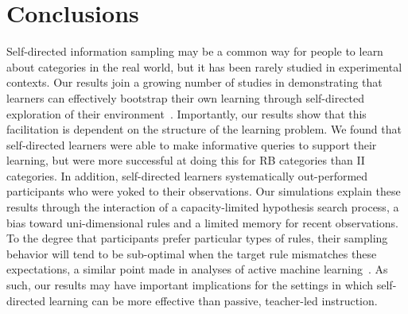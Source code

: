 \documentclass[3p,twocolumn,authoryear,10pt]{elsarticle}
\begin{document}
\section{Conclusions} 

Self-directed information sampling may be a common way for people to learn about categories 
in the real world, but it has been rarely studied in experimental contexts. Our results join a growing number of studies in demonstrating that learners can effectively bootstrap their own learning through self-directed exploration of their environment~\citep{Atkinson:1972rz,Atkinson:1972rm,Fazio:2004jw,Castro:2008p12850,Steyvers:2003p5901,sobel2006importance}.
Importantly, our results show that this facilitation is dependent on the structure of the learning problem. 
We found that self-directed learners were able to make informative queries to support their learning, but were more successful at doing this for RB categories than II categories. In addition, self-directed learners systematically out-performed participants who were yoked to their observations.  Our simulations explain these results through the interaction of a capacity-limited hypothesis search process, a bias toward  uni-dimensional rules and a limited memory for recent observations. To the degree that participants prefer particular types of rules, their sampling behavior will tend to be sub-optimal when the target rule mismatches these expectations, a similar point made in analyses of active machine learning~\citep{Mackay:1992kn,Settles:2009p13423}. As such, our results may have important implications for the settings in which self-directed learning can be more effective than passive, teacher-led instruction. 


\end{document}
